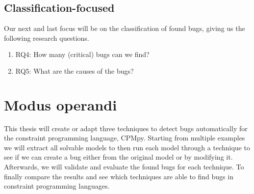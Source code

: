 
\subsection{Classification-focused}
\label{intro:RQ:ClassificationFocused}
Our next and last focus will be on the classification of found bugs, giving us the following research questions. \newline
\begin{enumerate}
	\item RQ4: How many (critical) bugs can we find?
	\item RQ5: What are the causes of the bugs?
\end{enumerate}




\section{Modus operandi}
This thesis will create or adapt three techniques to detect bugs automatically for the constraint programming language, CPMpy. Starting from multiple examples we will extract all solvable models to then run each model through a technique to see if we can create a bug either from the original model or by modifying it. Afterwards, we will validate and evaluate the found bugs for each technique. To finally compare the results and see which techniques are able to find bugs in constraint programming languages.


